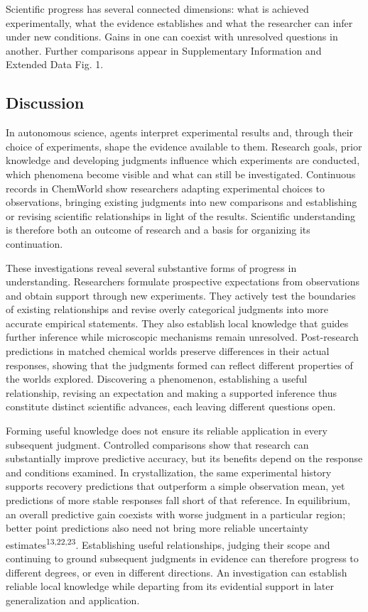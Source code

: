 \documentclass[10pt,a4paper]{article}
\begin{document}
Scientific progress has several connected dimensions: what is achieved experimentally, what the evidence establishes and what the researcher can infer under new conditions. Gains in one can coexist with unresolved questions in another. Further comparisons appear in Supplementary Information and Extended Data Fig. 1.

\FloatBarrier
\subsection{Discussion}\label{discussion}

In autonomous science, agents interpret experimental results and, through their choice of experiments, shape the evidence available to them. Research goals, prior knowledge and developing judgments influence which experiments are conducted, which phenomena become visible and what can still be investigated. Continuous records in ChemWorld show researchers adapting experimental choices to observations, bringing existing judgments into new comparisons and establishing or revising scientific relationships in light of the results. Scientific understanding is therefore both an outcome of research and a basis for organizing its continuation.

These investigations reveal several substantive forms of progress in understanding. Researchers formulate prospective expectations from observations and obtain support through new experiments. They actively test the boundaries of existing relationships and revise overly categorical judgments into more accurate empirical statements. They also establish local knowledge that guides further inference while microscopic mechanisms remain unresolved. Post-research predictions in matched chemical worlds preserve differences in their actual responses, showing that the judgments formed can reflect different properties of the worlds explored. Discovering a phenomenon, establishing a useful relationship, revising an expectation and making a supported inference thus constitute distinct scientific advances, each leaving different questions open.

Forming useful knowledge does not ensure its reliable application in every subsequent judgment. Controlled comparisons show that research can substantially improve predictive accuracy, but its benefits depend on the response and conditions examined. In crystallization, the same experimental history supports recovery predictions that outperform a simple observation mean, yet predictions of more stable responses fall short of that reference. In equilibrium, an overall predictive gain coexists with worse judgment in a particular region; better point predictions also need not bring more reliable uncertainty estimates\textsuperscript{13,22,23}. Establishing useful relationships, judging their scope and continuing to ground subsequent judgments in evidence can therefore progress to different degrees, or even in different directions. An investigation can establish reliable local knowledge while departing from its evidential support in later generalization and application.
\end{document}
